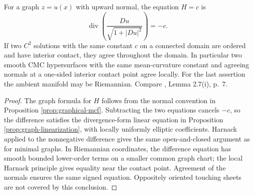 \begin{proposition}\label{prop:cmc-graph-contact}
For a graph $z=u(x)$ with upward normal, the equation $H=c$ is
\[
 \operatorname{div}\left(\frac{Du}{\sqrt{1+|Du|^2}}\right)=-c.
\]
If two $C^2$ solutions with the same constant $c$ on a connected domain are ordered and have interior contact, they agree throughout the domain. In particular two smooth CMC hypersurfaces with the same mean-curvature constant and agreeing normals at a one-sided interior contact point agree locally. For the last assertion the ambient manifold may be Riemannian. Compare \cite{ZZCMC}, Lemma 2.7(i), p.~7.
\end{proposition}
\begin{proof}
The graph formula for $H$ follows from the normal convention in Proposition \ref{prop:graphical-mcf}. Subtracting the two equations cancels $-c$, so the difference satisfies the divergence-form linear equation in Proposition \ref{prop:graph-linearization}, with locally uniformly elliptic coefficients. Harnack applied to the nonnegative difference gives the same open-and-closed argument as for minimal graphs. In Riemannian coordinates, the difference equation has smooth bounded lower-order terms on a smaller common graph chart; the local Harnack principle gives equality near the contact point. Agreement of the normals ensures the same signed equation. Oppositely oriented touching sheets are not covered by this conclusion.
\end{proof}
